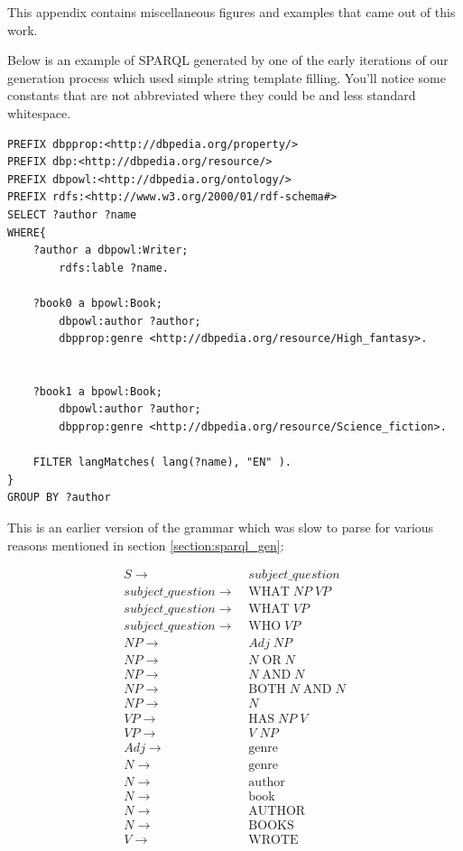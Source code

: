 \documentclass[11pt]{article}
\begin{document}
{This appendix contains miscellaneous figures and examples that came out of this work.

Below is an example of SPARQL generated by one of the early iterations of our generation process
which used simple string template filling. You'll notice some constants that are
not abbreviated where they could be and less standard whitespace.

\begin{verbatim}
PREFIX dbpprop:<http://dbpedia.org/property/>
PREFIX dbp:<http://dbpedia.org/resource/>
PREFIX dbpowl:<http://dbpedia.org/ontology/>
PREFIX rdfs:<http://www.w3.org/2000/01/rdf-schema#>
SELECT ?author ?name
WHERE{
    ?author a dbpowl:Writer;
        rdfs:lable ?name.

    ?book0 a bpowl:Book;
        dbpowl:author ?author;
        dbpprop:genre <http://dbpedia.org/resource/High_fantasy>.


    ?book1 a bpowl:Book;
        dbpowl:author ?author;
        dbpprop:genre <http://dbpedia.org/resource/Science_fiction>.

    FILTER langMatches( lang(?name), "EN" ).
}
GROUP BY ?author
\end{verbatim}

\clearpage

This is an earlier version of the grammar which was slow to parse for
various reasons mentioned in section \ref{section:sparql_gen}:
\begin{figure}[h!]
\setcounter{equation}{0}
\begin{align}
S \rightarrow\; & subject\_question \\
subject\_question \rightarrow\; & \text{WHAT} \; NP \; VP \\
subject\_question \rightarrow\; & \text{WHAT} \; VP \\
subject\_question \rightarrow\; & \text{WHO} \; VP \\
NP \rightarrow\; & Adj \; NP \\
NP \rightarrow\; & N \; \text{OR} \; N \\
NP \rightarrow\; & N \; \text{AND} \; N \\
NP \rightarrow\; & \text{BOTH} \; N \; \text{AND} \; N \\
NP \rightarrow\; & N\\
VP \rightarrow\; & \text{HAS} \; NP \; V \\
VP \rightarrow\; & V \; NP \\
Adj \rightarrow\; & \text{genre} \\
N \rightarrow\; & \text{genre} \\
N \rightarrow\; & \text{author} \\
N \rightarrow\; & \text{book} \\
N \rightarrow\; & \text{AUTHOR} \\
N \rightarrow\; & \text{BOOKS} \\
V \rightarrow\; & \text{WROTE}
\end{align}


\end{figure}}
\end{document}
